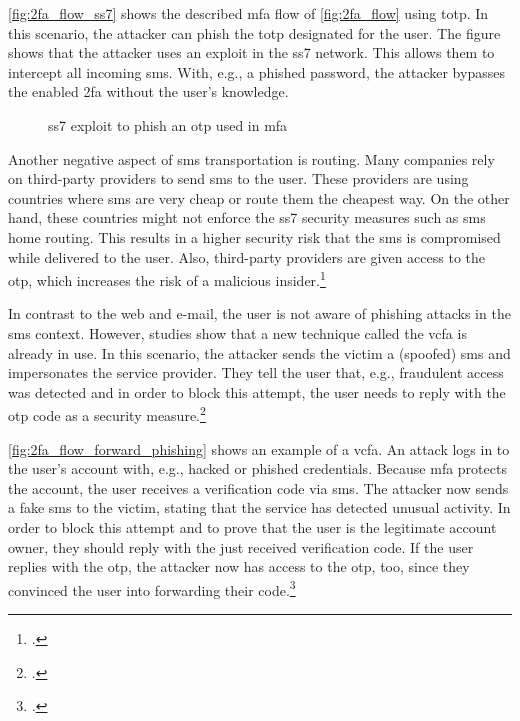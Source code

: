 \autoref{fig:2fa_flow_ss7} shows the described \gls{mfa} flow of \autoref{fig:2fa_flow} using \gls{totp}. In this scenario, the attacker can phish the \gls{totp} designated for the user. The figure shows that the attacker uses an exploit in the \gls{ss7} network. This allows them to intercept all incoming \gls{sms}. With, e.g., a phished password, the attacker bypasses the enabled \gls{2fa} without the user's knowledge.

\begin{figure}[hbt]
	\centering
	
	\caption[\gls{ss7} exploit to phish an \gls{otp} used in \gls{mfa}]{\gls{ss7} exploit to phish an \gls{otp} used in \gls{mfa}\footnotemark}
	\label{fig:2fa_flow_ss7}
\end{figure}

Another negative aspect of \gls{sms} transportation is routing. Many companies rely on third-party providers to send \gls{sms} to the user. These providers are using countries where \gls{sms} are very cheap or route them the cheapest way. On the other hand, these countries might not enforce the \gls{ss7} security measures such as \gls{sms} home routing. This results in a higher security risk that the \gls{sms} is compromised while delivered to the user. Also, third-party providers are given access to the \gls{otp}, which increases the risk of a malicious insider.\footcites[See][153]{10.1007/978-3-642-39235-1_9}[See][4, 9, 12]{Certic2018}

In contrast to the web and e-mail, the user is not aware of phishing attacks in the \gls{sms} context. However, studies show that a new technique called the \gls{vcfa} is already in use. In this scenario, the attacker sends the victim a (spoofed) \gls{sms} and impersonates the service provider. They tell the user that, e.g., fraudulent access was detected and in order to block this attempt, the user needs to reply with the \gls{otp} code as a security measure.\footcites[See][6--7]{JAKOBSSON20186}[See][4--5]{SIADATI201714}

\newpage

\autoref{fig:2fa_flow_forward_phishing} shows an example of a \gls{vcfa}. An attack logs in to the user's account with, e.g., hacked or phished credentials. Because \gls{mfa} protects the account, the user receives a verification code via \gls{sms}. The attacker now sends a fake \gls{sms} to the victim, stating that the service has detected unusual activity. In order to block this attempt and to prove that the user is the legitimate account owner, they should reply with the just received verification code. If the user replies with the \gls{otp}, the attacker now has access to the \gls{otp}, too, since they convinced the user into forwarding their code.\footcites[See][66]{10.1007/978-3-319-29938-9_5}

